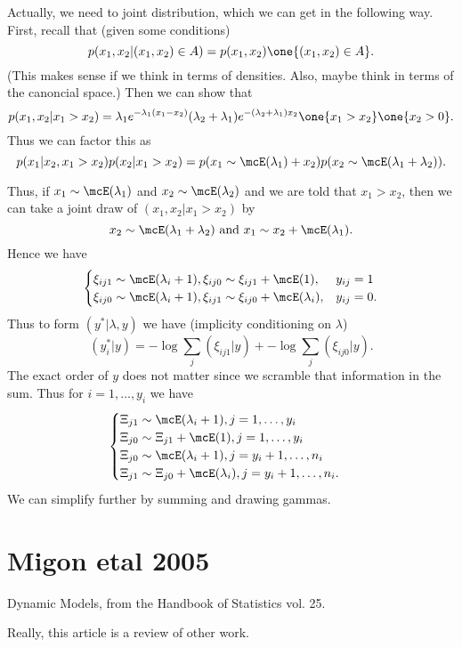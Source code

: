 \documentclass{article}
\begin{document}
Actually, we need to joint distribution, which we can get in the following way.
First, recall that (given some conditions)
\[
p(x_1, x_2 | (x_1, x_2) \in A) = p(x_1, x_2) \one \{ (x_1, x_2) \in A \}.
\]
(This makes sense if we think in terms of densities.  Also, maybe think in terms
of the canoncial space.)  Then we can show that
\[
p(x_1, x_2 | x_1 > x_2) = \lambda_1 e^{- \lambda_1 (x_1 - x_2)} 
(\lambda_2 + \lambda_1) e^{-(\lambda_2 + \lambda_1) x_2} \one \{x_1 > x_2\} \one
\{x_2 > 0 \}.
\]
Thus we can factor this as
\[
p(x_1 | x_2, x_1 > x_2) p(x_2 | x_1 > x_2) = p(x_1 \sim \mcE(\lambda_1) + x_2)
p(x_2 \sim \mcE(\lambda_1 + \lambda_2)).
\]

Thus, if $x_1 \sim \mcE(\lambda_1)$ and $x_2 \sim \mcE(\lambda_2)$ and we are
told that $x_1 > x_2$, then we can take a joint draw of $(x_1, x_2 | x_1 > x_2)$
by
\[
x_2 \sim \mcE(\lambda_1 + \lambda_2) \text{ and } 
x_1 \sim x_2 + \mcE(\lambda_1).
\]
Hence we have
\[
\begin{cases}
\xi_{ij1} \sim \mcE(\lambda_i + 1), \xi_{ij0} \sim \xi_{ij1} + \mcE(1), & y_{ij} =
1 \\
\xi_{ij0} \sim \mcE(\lambda_i + 1), \xi_{ij1} \sim \xi_{ij0} + \mcE(\lambda_i), &
y_{ij} = 0.
\end{cases}
\]
Thus to form $(y^*|\lambda,y)$ we have (implicity conditioning on $\lambda$)
\[
(y_{i}^* | y) = - \log \sum_{j} (\xi_{ij1}|y) + -\log \sum_{j} (\xi_{ij0}|y).
\]
The exact order of $y$ does not matter since we scramble that information in the
sum.  Thus for $i =1, \ldots, y_i$ we have
\[
\begin{cases}
\Xi_{j1} \sim \mcE(\lambda_i+1), j=1, \ldots, y_i \\
\Xi_{j0} \sim \Xi_{j1} + \mcE(1), j=1, \ldots, y_i \\
\Xi_{j0} \sim \mcE(\lambda_i+1), j=y_i+1, \ldots, n_i \\
\Xi_{j1} \sim \Xi_{j0} + \mcE(\lambda_i), j=y_i+1, \ldots, n_i.
\end{cases}
\]
We can simplify further by summing and drawing gammas.

\section{Migon etal 2005}

Dynamic Models, from the Handbook of Statistics vol. 25.

Really, this article is a review of other work.
\end{document}
